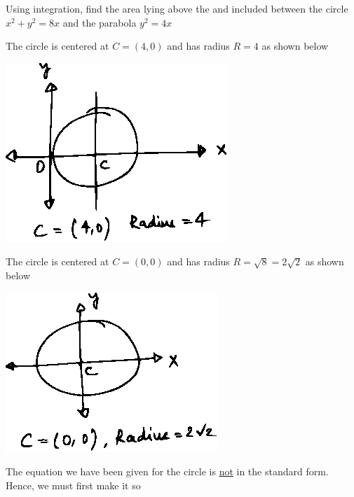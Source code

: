 \documentclass[14pt,fleqn]{extarticle}
\begin{document}
 

\begin{problem}
	\statement 
    
     Using integration, find the area lying above the \xaxis and included between the circle $x^2 + y^2 = 8x$ and the parabola $y^2 = 4x$ 
     
     \begin{step}
  \begin{options} 
     \correct 
       
     The circle is centered at $C = \left(4,0 \right)$ and has radius $R = 4$ as shown below 

     \begin{center}
\includegraphics[scale=1.2]{1381-A.eps}
\end{center}
     \incorrect
     
          The circle is centered at $C = \left(0,0 \right)$ and has radius $R = \sqrt{8} = 2\sqrt{2}$ as shown below 
        
        \begin{center}
\includegraphics[scale=1.2]{1381-B.eps}
\end{center}
    \end{options} 
     \reason 
     
     The equation we have been given for the circle is \underline{not} in the 
     standard form. Hence, we must first make it so
     

\end{step}
\end{problem}
\end{document}
